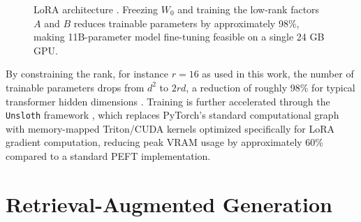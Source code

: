 \begin{figure}[htbp]
\centering
{}
\caption{LoRA architecture \citep{lora}. Freezing $W_0$ and training the low-rank factors $A$ and $B$ reduces trainable parameters by approximately 98\%, making 11B-parameter model fine-tuning feasible on a single 24 GB GPU.}
\label{fig:lora_architecture}
\end{figure}

By constraining the rank, for instance $r = 16$ as used in this work, the number of trainable parameters drops from $d^2$ to $2rd$, a reduction of roughly 98\% for typical transformer hidden dimensions \citep{qlora}. Training is further accelerated through the \texttt{Unsloth} framework \citep{unsloth}, which replaces PyTorch's standard computational graph with memory-mapped Triton/CUDA kernels optimized specifically for LoRA gradient computation, reducing peak VRAM usage by approximately 60\% compared to a standard PEFT \citep{peft_houlsby} implementation.

\section{Retrieval-Augmented Generation}
\label{sec:rag}


